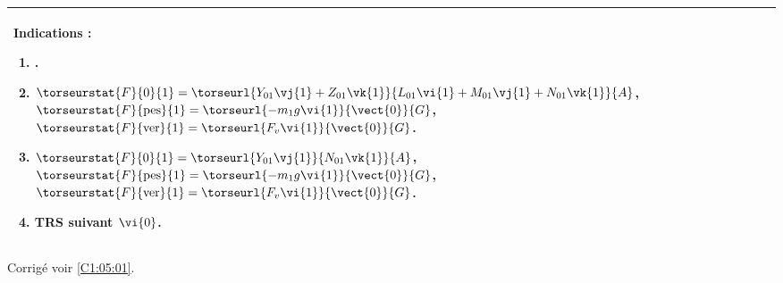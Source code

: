 \ifprof
\else
\ifcolle
\else
\footnotesize
\begin{center}
\begin{tabular}{|p{.9\linewidth}|}
\hline
Indications :
\begin{enumerate}
\item .
\item $\torseurstat{F}{0}{1}=\torseurl{Y_{01}\vj{1}+Z_{01}\vk{1}}{L_{01}\vi{1}+M_{01}\vj{1}+N_{01}\vk{1}}{A}$,
$\torseurstat{F}{\text{pes}}{1}=\torseurl{-m_1g\vi{1}}{\vect{0}}{G}$, 
$\torseurstat{F}{\text{ver}}{1}=\torseurl{F_v\vi{1}}{\vect{0}}{G}$.
\item $\torseurstat{F}{0}{1}=\torseurl{Y_{01}\vj{1}}{N_{01}\vk{1}}{A}$,
$\torseurstat{F}{\text{pes}}{1}=\torseurl{-m_1g\vi{1}}{\vect{0}}{G}$,
$\torseurstat{F}{\text{ver}}{1}=\torseurl{F_v\vi{1}}{\vect{0}}{G}$.
\item TRS suivant $\vi{0}$.
\end{enumerate} \\ \hline
\end{tabular}
\end{center}
\normalsize
\fi

\begin{flushright}
\footnotesize{Corrigé  voir \ref{C1:05:01}.}
\end{flushright}%
\fi


